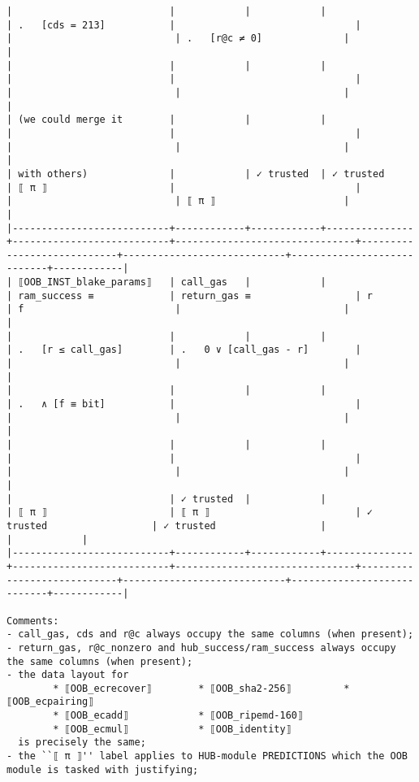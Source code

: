 \documentclass[varwidth=\maxdimen,margin=0.5cm,multi={verbatim}]{standalone}
\begin{document}
\begin{verbatim}
|                           |            |            |               | .   [cds = 213]           |                               |                            |                            | .   [r@c ≠ 0]              |            |
|                           |            |            |               |                           |                               |                            |                            |                            |            |
| (we could merge it        |            |            |               |                           |                               |                            |                            |                            |            |
| with others)              |            | ✓ trusted  | ✓ trusted     | ⟦ π ⟧                     |                               |                            |                            | ⟦ π ⟧                      |            |
|---------------------------+------------+------------+---------------+---------------------------+-------------------------------+----------------------------+----------------------------+----------------------------+------------|
| ⟦OOB_INST_blake_params⟧   | call_gas   |            |               | ram_success ≡             | return_gas ≡                  | r                          | f                          |                            |            |
|                           |            |            |               | .   [r ≤ call_gas]        | .   0 ∨ [call_gas - r]        |                            |                            |                            |            |
|                           |            |            |               | .   ∧ [f ≡ bit]           |                               |                            |                            |                            |            |
|                           |            |            |               |                           |                               |                            |                            |                            |            |
|                           | ✓ trusted  |            |               | ⟦ π ⟧                     | ⟦ π ⟧                         | ✓ trusted                  | ✓ trusted                  |                            |            |
|---------------------------+------------+------------+---------------+---------------------------+-------------------------------+----------------------------+----------------------------+----------------------------+------------|

Comments: 
- call_gas, cds and r@c always occupy the same columns (when present);
- return_gas, r@c_nonzero and hub_success/ram_success always occupy the same columns (when present);
- the data layout for
        * ⟦OOB_ecrecover⟧        * ⟦OOB_sha2-256⟧         * ⟦OOB_ecpairing⟧
        * ⟦OOB_ecadd⟧            * ⟦OOB_ripemd-160⟧                  
        * ⟦OOB_ecmul⟧            * ⟦OOB_identity⟧
  is precisely the same;
- the ``⟦ π ⟧'' label applies to HUB-module PREDICTIONS which the OOB module is tasked with justifying;


\end{verbatim}
\end{document}
